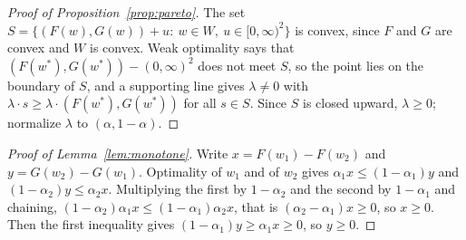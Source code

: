 \documentclass[11pt]{article}
\theoremstyle{remark}
\newcommand{\1}{\mathbf{1}}
\begin{document}
\begin{proof}[Proof of Proposition~\ref{prop:pareto}]
The set $S=\{(F(w),G(w))+u:\ w\in W,\ u\in[0,\infty)^2\}$ is convex, since $F$ and $G$ are convex and $W$ is convex.
Weak optimality says that $(F(w^\ast),G(w^\ast))-(0,\infty)^2$ does not meet $S$, so the point lies on the boundary of $S$,
and a supporting line gives $\lambda\neq0$ with $\lambda\cdot s\ge\lambda\cdot(F(w^\ast),G(w^\ast))$ for all $s\in S$.
Since $S$ is closed upward, $\lambda\ge0$; normalize $\lambda$ to $(\alpha,1-\alpha)$.
\end{proof}

\begin{proof}[Proof of Lemma~\ref{lem:monotone}]
Write $x=F(w_1)-F(w_2)$ and $y=G(w_2)-G(w_1)$. Optimality of $w_1$ and of $w_2$ gives $\alpha_1x\le(1-\alpha_1)y$ and
$(1-\alpha_2)y\le\alpha_2x$. Multiplying the first by $1-\alpha_2$ and the second by $1-\alpha_1$ and chaining,
$(1-\alpha_2)\alpha_1x\le(1-\alpha_1)\alpha_2x$, that is $(\alpha_2-\alpha_1)x\ge0$, so $x\ge0$. Then the first
inequality gives $(1-\alpha_1)y\ge\alpha_1x\ge0$, so $y\ge0$.
\end{proof}


\end{document}
